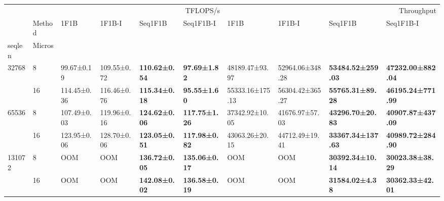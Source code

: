 \begin{tabular}{llllllllll}
\toprule
 &  & \multicolumn{4}{r}{TFLOPS/s} & \multicolumn{4}{r}{Throughput} \\
 & Method & 1F1B & 1F1B-I & Seq1F1B & Seq1F1B-I & 1F1B & 1F1B-I & Seq1F1B & Seq1F1B-I \\
seqlen & Micros &  &  &  &  &  &  &  &  \\
\midrule
\multirow[t]{2}{*}{32768} & 8 & 99.67±0.19 & 109.55±0.72 & \textbf{110.62±0.54} & \textbf{97.69±1.82} & 48189.47±93.97 & 52964.06±348.28 & \textbf{53484.52±259.03} & \textbf{47232.00±882.04} \\
 & 16 & 114.45±0.36 & 116.46±0.76 & \textbf{115.34±0.18} & \textbf{95.55±1.60} & 55333.16±175.13 & 56304.42±365.27 & \textbf{55765.31±89.28} & \textbf{46195.24±771.99} \\
\cline{1-10}
\multirow[t]{2}{*}{65536} & 8 & 107.49±0.03 & 119.96±0.16 & \textbf{124.62±0.06} & \textbf{117.75±1.26} & 37342.92±10.05 & 41676.97±57.03 & \textbf{43296.70±20.83} & \textbf{40907.87±437.09} \\
 & 16 & 123.95±0.06 & 128.70±0.06 & \textbf{123.05±0.51} & \textbf{117.98±0.82} & 43063.26±20.15 & 44712.49±19.41 & \textbf{33367.34±137.63} & \textbf{40989.72±284.90} \\
\cline{1-10}
\multirow[t]{2}{*}{131072} & 8 & OOM & OOM & \textbf{136.72±0.05} & \textbf{135.06±0.17} & OOM & OOM & \textbf{30392.34±10.14} & \textbf{30023.38±38.29} \\
 & 16 & OOM & OOM & \textbf{142.08±0.02} & \textbf{136.58±0.19} & OOM & OOM & \textbf{31584.02±4.38} & \textbf{30362.33±42.01} \\
\cline{1-10}
\bottomrule
\end{tabular}
